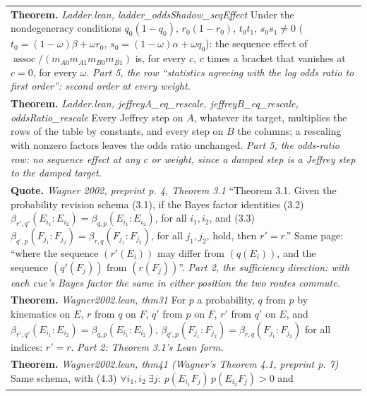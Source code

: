 \documentclass[10pt]{article}
\theoremstyle{definition}
\newcommand{\assoc}{\operatorname{assoc}}
\newlength{\fullw}\setlength{\fullw}{25.9cm}
\begin{document}
{\begin{longtable}{|p{0.9cm}|p{12.2cm}|p{12.2cm}|}
\multicolumn{3}{|p{\fullw}|}{\textbf{Theorem.} \textit{Ladder.lean, ladder\_oddsShadow\_seqEffect} \newline Under the nondegeneracy conditions $q_0(1-q_0)$, $r_0(1-r_0)$, $t_0t_1$, $s_0s_1\neq0$
($t_0=(1-\omega)\beta+\omega r_0$, $s_0=(1-\omega)\alpha+\omega q_0$): the sequence effect of
$\assoc/(m_{A0}m_{A1}m_{B0}m_{B1})$ is, for every $c$, $c$ times a bracket that vanishes at $c=0$,
for every $\omega$. \newline \textit{Part 5, the row ``statistics agreeing with the log odds ratio to first order'': second order at every weight.}} \\
\multicolumn{3}{|p{\fullw}|}{\textbf{Theorem.} \textit{Ladder.lean, jeffreyA\_eq\_rescale, jeffreyB\_eq\_rescale, oddsRatio\_rescale} \newline Every Jeffrey step on $A$, whatever its target, multiplies the rows of the table by
constants, and every step on $B$ the columns; a rescaling with nonzero factors leaves the
odds ratio unchanged. \newline \textit{Part 5, the odds-ratio row: no sequence effect at any $c$ or weight, since a damped step is a Jeffrey step to the damped target.}} \\
\multicolumn{3}{|p{\fullw}|}{\textbf{Quote.} \textit{Wagner 2002, preprint p. 4, Theorem 3.1} \newline ``Theorem 3.1. Given the probability revision schema (3.1), if the Bayes factor
identities (3.2) $\beta_{r',q'}(E_{i_1}:E_{i_2})=\beta_{q,p}(E_{i_1}:E_{i_2})$, for all
$i_1,i_2$, and (3.3) $\beta_{q',p}(F_{j_1}:F_{j_2})=\beta_{r,q}(F_{j_1}:F_{j_2})$, for
all $j_1,j_2$, hold, then $r'=r$.'' Same page: ``where the sequence $(r'(E_i))$ may
differ from $(q(E_i))$, and the sequence $(q'(F_j))$ from $(r(F_j))$''. \newline \textit{Part 2, the sufficiency direction: with each cue's Bayes factor the same in either position the two routes commute.}} \\
\multicolumn{3}{|p{\fullw}|}{\textbf{Theorem.} \textit{Wagner2002.lean, thm31} \newline For $p$ a probability, $q$ from $p$ by kinematics on $E$, $r$ from $q$ on $F$,
$q'$ from $p$ on $F$, $r'$ from $q'$ on $E$, and
$\beta_{r',q'}(E_{i_1}:E_{i_2})=\beta_{q,p}(E_{i_1}:E_{i_2})$,
$\beta_{q',p}(F_{j_1}:F_{j_2})=\beta_{r,q}(F_{j_1}:F_{j_2})$ for all indices:
$r'=r$. \newline \textit{Part 2: Theorem 3.1's Lean form.}} \\
\multicolumn{3}{|p{\fullw}|}{\textbf{Theorem.} \textit{Wagner2002.lean, thm41 (Wagner's Theorem 4.1, preprint p. 7)} \newline Same schema, with (4.3) $\forall i_1,i_2\ \exists j:\ p(E_{i_1}F_j)\,p(E_{i_2}F_j)>0$ and
}
\end{longtable}}
\end{document}
